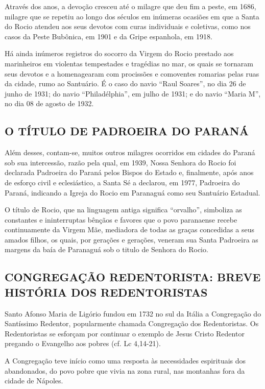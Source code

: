 \documentclass[a4paper,14pt,twoside]{extarticle} \usepackage[utf8]{inputenc}
\begin{document}
Através dos anos, a devoção cresceu até o milagre que deu fim a peste, em 1686, milagre que se repetiu ao longo dos séculos em inúmeras ocasiões em que a Santa do Rocio atendeu aos seus devotos com curas individuais e coletivas, como nos casos da Peste Bubônica, em 1901 e da Gripe espanhola, em 1918.

Há ainda inúmeros registros do socorro da Virgem do Rocio prestado aos marinheiros em violentas tempestades e tragédias no mar, os quais se tornaram seus devotos e a homenagearam com procissões e comoventes romarias pelas ruas da cidade, rumo ao Santuário. É o caso do navio “Raul Soares”, no dia 26 de junho de 1931; do navio “Philadélphia”, em julho de 1931; e do navio “Maria M”, no dia 08 de agosto de 1932.

 
\subsection{O TÍTULO DE PADROEIRA DO PARANÁ}

Além desses, contam-se, muitos outros milagres ocorridos em cidades do Paraná sob sua intercessão, razão pela qual, em 1939, Nossa Senhora do Rocio foi declarada Padroeira do Paraná pelos Bispos do Estado e, finalmente, após anos de esforço civil e eclesiástico, a Santa Sé a declarou, em 1977, Padroeira do Paraná, indicando a Igreja do Rocio em Paranaguá como seu Santuário Estadual.

O título de Rocio, que na linguagem antiga significa “orvalho”, simboliza as constantes e ininterruptas bênçãos e favores que o povo paranaense recebe continuamente da Virgem Mãe, mediadora de todas as graças concedidas a seus amados filhos, os quais, por gerações e gerações, veneram sua Santa Padroeira as margens da baía de Paranaguá sob o titulo de Senhora do Rocio.

\subsection{CONGREGAÇÃO REDENTORISTA: BREVE HISTÓRIA DOS REDENTORISTAS}

Santo Afonso Maria de Ligório fundou em 1732 no sul da Itália a Congregação do Santíssimo Redentor, popularmente chamada Congregação dos Redentoristas.
Os Redentoristas se esforçam por continuar o exemplo de Jesus Cristo Redentor pregando o Evangelho aos pobres (cf. Lc 4,14-21).

A Congregação teve início como uma resposta às necessidades espirituais dos abandonados, do povo pobre que vivia na zona rural, nas montanhas fora da cidade de Nápoles.
\end{document}
